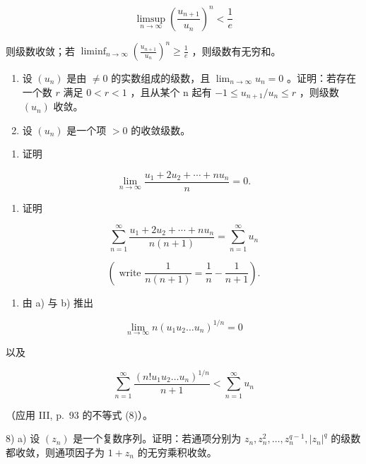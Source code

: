 \[
\operatorname * {l i m s u p} _ {n \to \infty} \left(\frac {u _ {n + 1}}{u _ {n}}\right) ^ {n} <   \frac {1}{e}
\]

则级数收敛；若 \(\liminf_{n\to\infty}\left(\frac{u_{n+1}}{u_n}\right)^n\geqslant\frac{1}{e}\) ，则级数有无穷和。

\begin{enumerate}
\def\labelenumi{\arabic{enumi})}
\setcounter{enumi}{5}
\item
  设 \((u_{n})\) 是由 \(\neq 0\) 的实数组成的级数，且 \(\lim_{n\to \infty}u_n = 0\) 。证明：若存在一个数 \(r\) 满足 \(0 < r < 1\) ，且从某个 n 起有 \(-1\leqslant u_{n + 1} / u_n\leqslant r\) ，则级数 \((u_{n})\) 收敛。
\item
  设 \((u_{n})\) 是一个项 \(>0\) 的收敛级数。
\end{enumerate}

\begin{enumerate}
\def\labelenumi{\alph{enumi})}
\tightlist
\item
  证明
\end{enumerate}

\[
\lim _ {n \rightarrow \infty} \frac {u _ {1} + 2 u _ {2} + \cdots + n u _ {n}}{n} = 0.
\]

\begin{enumerate}
\def\labelenumi{\alph{enumi})}
\setcounter{enumi}{1}
\tightlist
\item
  证明
\end{enumerate}

\[
\sum_ {n = 1} ^ {\infty} \frac {u _ {1} + 2 u _ {2} + \cdots + n u _ {n}}{n (n + 1)} = \sum_ {n = 1} ^ {\infty} u _ {n}
\]

\[
\left(\text { write } \frac {1}{n (n + 1)} = \frac {1}{n} - \frac {1}{n + 1}\right).
\]

\begin{enumerate}
\def\labelenumi{\alph{enumi})}
\setcounter{enumi}{2}
\tightlist
\item
  由 a) 与 b) 推出
\end{enumerate}

\[
\lim _ {n \to \infty} n (u _ {1} u _ {2} \dots u _ {n}) ^ {1 / n} = 0
\]

以及

\[
\sum_ {n = 1} ^ {\infty} \frac {(n ! u _ {1} u _ {2} \dots u _ {n}) ^ {1 / n}}{n + 1} <   \sum_ {n = 1} ^ {\infty} u _ {n}
\]

（应用 III, p.~93 的不等式 (8)）。

8) a) 设 \((z_{n})\) 是一个复数序列。证明：若通项分别为 \(z_{n}, z_{n}^{2}, \ldots, z_{n}^{q-1}, |z_{n}|^{q}\) 的级数都收敛，则通项因子为 \(1 + z_{n}\) 的无穷乘积收敛。

